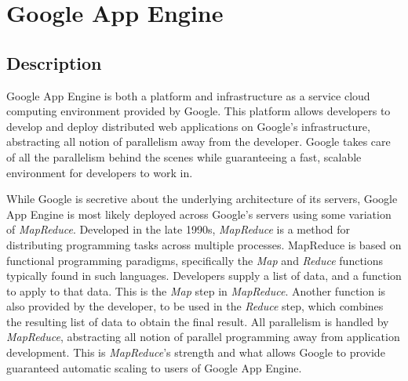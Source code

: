 \newcommand{\gae}[0]{Google App Engine}
\newcommand{\mr}[0]{\emph{MapReduce}}
\chapter{Google App Engine}

\section{Description}
\gae{} is both a platform and infrastructure as a service cloud computing environment provided by Google. This platform allows developers to develop and deploy distributed web applications on Google's infrastructure, abstracting all notion of parallelism away from the developer. Google takes care of all the parallelism behind the scenes while guaranteeing a fast, scalable environment for developers to work in. 

While Google is secretive about the underlying architecture of its servers, \gae{} is most likely deployed across Google's servers using some variation of \mr{}. Developed in the late 1990s, \mr{} is a method for distributing programming tasks across multiple processes. MapReduce is based on functional programming paradigms, specifically the \emph{Map} and \emph{Reduce} functions typically found in such languages. Developers supply a list of data, and a function to apply to that data. This is the \emph{Map} step in \mr{}. Another function is also provided by the developer, to be used in the \emph{Reduce} step, which combines the resulting list of data to obtain the final result. All parallelism is handled by \mr{}, abstracting all notion of parallel programming away from application development. This is \mr{}'s strength and what allows Google to provide guaranteed automatic scaling to users of \gae{}.

%

